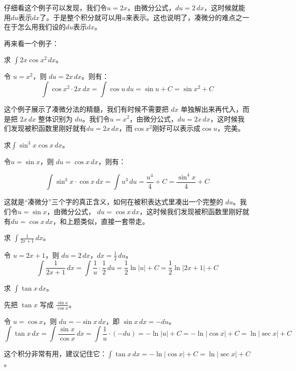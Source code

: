 仔细看这个例子可以发现，我们令$u = 2x$，由微分公式，$du = 2\, dx$，这时候就能用$du$表示$dx$了。于是整个积分就可以用$u$来表示。这也说明了，凑微分的难点之一在于怎么用我们设的$du$表示$dx$。

再来看一个例子：

\begin{myexample}
  求 $\int 2x \cos x^2\, dx$。

  令 $u = x^2$，则 $du = 2x\, dx$。则有：
  \[
  \int \cos x^2 \cdot 2x\, dx = \int \cos u\, du = \sin u + C = \sin x^2  + C
  \]

\end{myexample}

  这个例子展示了凑微分法的精髓，我们有时候不需要把 $dx$ 单独解出来再代入，而是把 $2x\,dx$ 整体识别为 $du$。我们令$u = x^2$，由微分公式，$du = 2x\, dx$，这时候我们发现被积函数里刚好就有$du = 2x\, dx$，而$\cos x^2$刚好可以表示成$\cos u$，完美。

\begin{myexample}
  求$\int \sin^3 x \cos x\, dx$。

  令$u = \sin x$，则 $du = \cos x\, dx$，则有：

\[
\int \sin^3 x \cdot \cos x\, dx = \int u^3 \, du = \frac{u^4}{4} + C = \frac{\sin^4 x}{4} + C
\]
\end{myexample}

这就是“凑微分”三个字的真正含义，如何在被积表达式里凑出一个完整的 $du$。我们令$u = \sin x$，由微分公式， $du = \cos x\, dx$，这时候我们发现被积函数里刚好就有$du = \cos x\, dx$，和上题类似，直接一套带走。

\begin{myexample}
  求 $\int \frac{1}{2x+1}\, dx$。

  令 $u = 2x+1$，则 $du = 2\, dx$，$dx = \frac{1}{2}\, du$。
  \[
  \int \frac{1}{2x+1}\, dx = \int \frac{1}{u} \cdot \frac{1}{2}\, du
  = \frac{1}{2} \ln|u| + C
  = \frac{1}{2} \ln|2x+1| + C
  \]
\end{myexample}

\begin{myexample}
  求 $\int \tan x\, dx$。

  先把 $\tan x$ 写成 $\frac{\sin x}{\cos x}$。
  
  令 $u = \cos x$，则 $du = -\sin x\, dx$，即 $\sin x\, dx = -du$。
  \[
  \int \tan x\, dx = \int \frac{\sin x}{\cos x}\, dx
  = \int \frac{1}{u} \cdot (-du)
  = -\ln|u| + C
  = -\ln|\cos x| + C
  = \ln|\sec x| + C
  \]

  这个积分非常有用，建议记住它：$\int \tan x\, dx = -\ln|\cos x| + C = \ln|\sec x| + C$。
\end{myexample}

